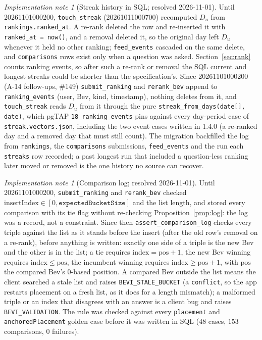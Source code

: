 \documentclass[11pt]{article}
\newcommand{\code}[1]{\texttt{#1}}
\theoremstyle{plain}
\theoremstyle{definition}
\theoremstyle{remark}
\newtheorem{implnote}[theorem]{Implementation note}
\begin{document}
\begin{implnote}[Streak history in SQL; resolved 2026-11-01]\label{impl:streak}
Until 20261101000200, \code{touch\_streak} (20261011000700) recomputed $D_u$ from \code{rankings.ranked\_at}. A re-rank deleted the row and re-inserted it with \code{ranked\_at = now()}, and a removal deleted it, so the original day left $D_u$ whenever it held no other ranking; \code{feed\_events} cascaded on the same delete, and \code{comparisons} rows exist only when a question was asked. Section~\ref{sec:rank} counts ranking events, so after such a re-rank or removal the SQL current and longest streaks could be shorter than the specification's. Since 20261101000200 (A-14 follow-ups, \#149) \code{submit\_ranking} and \code{rerank\_bev} append to \code{ranking\_events} (user, Bev, kind, timestamp), nothing deletes from it, and \code{touch\_streak} reads $D_u$ from it through the pure \code{streak\_from\_days(date[], date)}, which pgTAP \code{18\_ranking\_events} pins against every day-period case of \code{streak.vectors.json}, including the two event cases written in 1.4.0 (a re-ranked day and a removed day that must still count). The migration backfilled the log from \code{rankings}, the \code{comparisons} submissions, \code{feed\_events} and the run each \code{streaks} row recorded; a past longest run that included a question-less ranking later moved or removed is the one history no source can recover.
\end{implnote}

\begin{implnote}[Comparison log; resolved 2026-11-01]\label{impl:logcheck}
Until 20261101000200, \code{submit\_ranking} and \code{rerank\_bev} checked $\mathrm{insertIndex} \in [0, \code{expectedBucketSize}]$ and the list length, and stored every comparison with its tie flag without re-checking Proposition~\ref{prop:log}: the log was a record, not a constraint. Since then \code{assert\_comparison\_log} checks every triple against the list as it stands before the insert (after the old row's removal on a re-rank), before anything is written: exactly one side of a triple is the new Bev and the other is in the list; a tie requires $\mathrm{index} = \mathrm{pos} + 1$, the new Bev winning requires $\mathrm{index} \le \mathrm{pos}$, the incumbent winning requires $\mathrm{index} \ge \mathrm{pos} + 1$, with $\mathrm{pos}$ the compared Bev's $0$-based position. A compared Bev outside the list means the client searched a stale list and raises \code{BEVI\_STALE\_BUCKET} (a \code{conflict}, so the app restarts placement on a fresh list, as it does for a length mismatch); a malformed triple or an index that disagrees with an answer is a client bug and raises \code{BEVI\_VALIDATION}. The rule was checked against every \code{placement} and \code{anchoredPlacement} golden case before it was written in SQL ($48$ cases, $153$ comparisons, $0$ failures).
\end{implnote}
\end{document}
